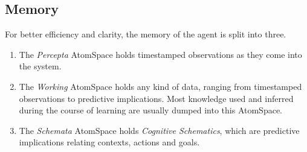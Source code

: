 \documentclass[runningheads]{llncs}
\begin{document}


\subsection{Memory}
For better efficiency and clarity, the memory of the agent is split
into three.
\begin{enumerate}
\item The \emph{Percepta}%
  AtomSpace holds timestamped
  observations as they come into the system.
\item The \emph{Working} AtomSpace holds any kind of data, ranging
  from timestamped observations to predictive implications.  Most
  knowledge used and inferred during the course of learning are
  usually dumped into this AtomSpace.
\item The \emph{Schemata} AtomSpace holds \emph{Cognitive Schematics},
  which are predictive implications relating contexts, actions and
  goals.%
\end{enumerate}
\end{document}
